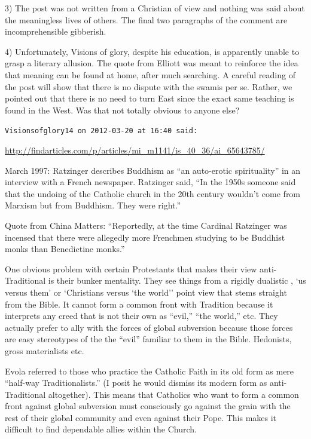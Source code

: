 \begin{footnotesize}
\begin{sffamily}
3) The post was not written from a Christian of view and nothing was said about the meaningless lives of others. The final two paragraphs of the comment are incomprehensible gibberish.

4) Unfortunately, Visions of glory, despite his education, is apparently unable to grasp a literary allusion. The quote from Elliott was meant to reinforce the idea that meaning can be found at home, after much searching. A careful reading of the post will show that there is no dispute with the swamis per se. Rather, we pointed out that there is no need to turn East since the exact same teaching is found in the West. Was that not totally obvious to anyone else?

\hfill

\texttt{Visionsofglory14 on 2012-03-20 at 16:40 said:}

\url{http://findarticles.com/p/articles/mi_m1141/is_40_36/ai_65643785/}


March 1997: Ratzinger describes Buddhism as ``an auto-erotic spirituality'' in an interview with a French newspaper. Ratzinger said, ``In the 1950s someone said that the undoing of the Catholic church in the 20th century wouldn't come from Marxism but from Buddhism. They were right.''

Quote from China Matters: ``Reportedly, at the time Cardinal Ratzinger was incensed that there were allegedly more Frenchmen studying to be Buddhist monks than Benedictine monks.''

One obvious problem with certain Protestants that makes their view anti-Traditional is their bunker mentality. They see things from a rigidly dualistic , `us versus them' or `Christians versus `the world'' point view that stems straight from the Bible. It cannot form a common front with Tradition because it interprets any creed that is not their own as ``evil,'' ``the world,'' etc. They actually prefer to ally with the forces of global subversion because those forces are easy stereotypes of the the ``evil'' familiar to them in the Bible. Hedonists, gross materialists etc.

Evola referred to those who practice the Catholic Faith in its old form as mere ``half-way Traditionalists.'' (I posit he would dismiss its modern form as anti-Traditional altogether). This means that Catholics who want to form a common front against global subversion must consciously go against the grain with the rest of their global community and even against their Pope. This makes it difficult to find dependable allies within the Church.


\end{sffamily}
\end{footnotesize}
